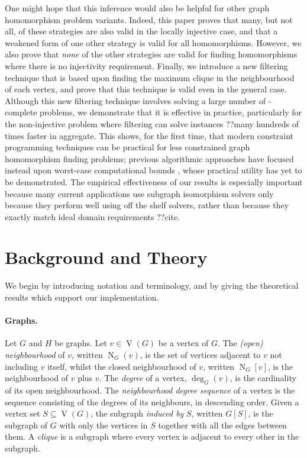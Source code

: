 \documentclass{article}
\newcommand{\neighbourhood}{\operatorname{N}}
\newcommand{\vertexset}{\operatorname{V}}
\newcommand{\degree}{\operatorname{deg}}
\begin{document}
One might hope that this inference would also be helpful for other graph homomorphism problem
variants. Indeed, this paper proves that many, but not all, of these strategies are also valid in
the locally injective case, and that a weakened form of one other strategy is valid for all
homomorphisms. However, we also prove that \emph{none} of the other strategies are valid for finding
homomorphisms where there is no injectivity requirement. Finally, we introduce a new filtering
technique that is based upon finding the maximum clique in the neighbourhood of each vertex, and
prove that this technique is valid even in the general case. Although this new filtering technique
involves solving a large number of \NP-complete problems, we demonstrate that it is effective in
practice, particularly for the non-injective problem where filtering can solve instances ??many
hundreds of times faster in aggregate. This shows, for the first time, that modern constraint
programming techniques can be practical for less constrained graph homomorphism finding problems;
previous algorithmic approaches have focused instead upon worst-case computational bounds
\cite{DBLP:journals/csr/FialaK08,DBLP:journals/ipl/Rzazewski14,DBLP:journals/tcs/ChaplickFHPT15},
whose practical utility has yet to be demonstrated. The empirical effectiveness of our results is
especially important because many current applications use subgraph isomorphism solvers only because
they perform well using off the shelf solvers, rather than because they exactly match ideal domain
requirements ??cite.

\section{Background and Theory}

We begin by introducing notation and terminology, and by giving the theoretical results which
support our implementation.

\paragraph{Graphs.} Let $G$ and $H$ be graphs. Let $v \in \vertexset(G)$ be a vertex of $G$. The
\emph{(open) neighbourhood} of $v$, written $\neighbourhood_G(v)$, is the set of vertices adjacent
to $v$ not including $v$ itself, whilst the closed neighbourhood of $v$, written
$\neighbourhood_G[v]$, is the neighbourhood of $v$ plus $v$. The \emph{degree} of a vertex, $\degree_G(v)$,
is the cardinality of its open neighbourhood. The \emph{neighbourhood degree sequence} of a vertex
is the sequence consisting of the degrees of its neighbours, in descending order. Given a vertex set
$S \subseteq \vertexset(G)$, the subgraph \emph{induced by} $S$, written $G[S]$, is the subgraph of
$G$ with only the vertices in $S$ together with all the edges between them. A \emph{clique} is a
subgraph where every vertex is adjacent to every other in the subgraph.
\end{document}
